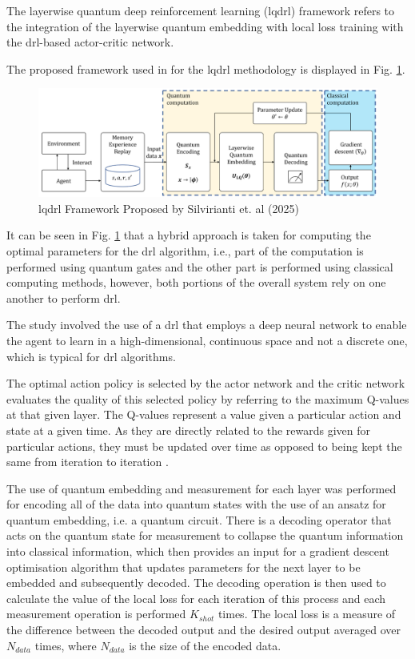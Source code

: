 The layerwise quantum deep reinforcement learning (\acrshort{lqdrl}) framework refers to the integration of the layerwise quantum embedding with local loss training with the \acrshort{drl}-based actor-critic network. 

The proposed framework used in \cite{silvirianti_layerwise_2024} for the \acrshort{lqdrl} methodology is displayed in Fig. \ref{fig:lqdrl_framework_silvirianti}.

\begin{figure}[ht]
    \centering
    \includegraphics[width=1\textwidth]{figures/lq_drl_framework_silviratani_et_al.png}
    \caption{\acrshort{lqdrl} Framework Proposed by Silvirianti et. al (2025)}
    \label{fig:lqdrl_framework_silvirianti}
\end{figure}
It can be seen in Fig. \ref{fig:lqdrl_framework_silvirianti} that a hybrid approach is taken for computing the optimal parameters for the \acrshort{drl} algorithm, i.e., part of the computation is performed using quantum gates and the other part is performed using classical computing methods, however, both portions of the overall system rely on one another to perform \acrshort{drl}. 

The study involved the use of a \acrshort{drl} that employs a deep neural network to enable the agent to learn in a high-dimensional, continuous space and not a discrete one, which is typical for \acrshort{drl} algorithms. 

The optimal action policy is selected by the actor network and the critic network evaluates the quality of this selected policy by referring to the maximum Q-values at that given layer. The Q-values represent a value given a particular action and state at a given time.
As they are directly related to the rewards given for particular actions, they must be updated over time as opposed to being kept the same from iteration to iteration \cite{skolik_quantum_2022}. 

The use of quantum embedding and measurement for each layer was performed for encoding all of the data into quantum states with the use of an ansatz for quantum embedding, i.e. a quantum circuit. 
There is a decoding operator that acts on the quantum state for measurement to collapse the quantum information into classical information, which then provides an input for a gradient descent optimisation algorithm that updates parameters for the next layer to be embedded and subsequently decoded. 
The decoding operation is then used to calculate the value of the local loss for each iteration of this process and each measurement operation is performed $K_{shot}$ times. The local loss is a measure of the difference between the decoded output and the desired output averaged over $N_{data}$ times, where $N_{data}$ is the size of the encoded data. 

